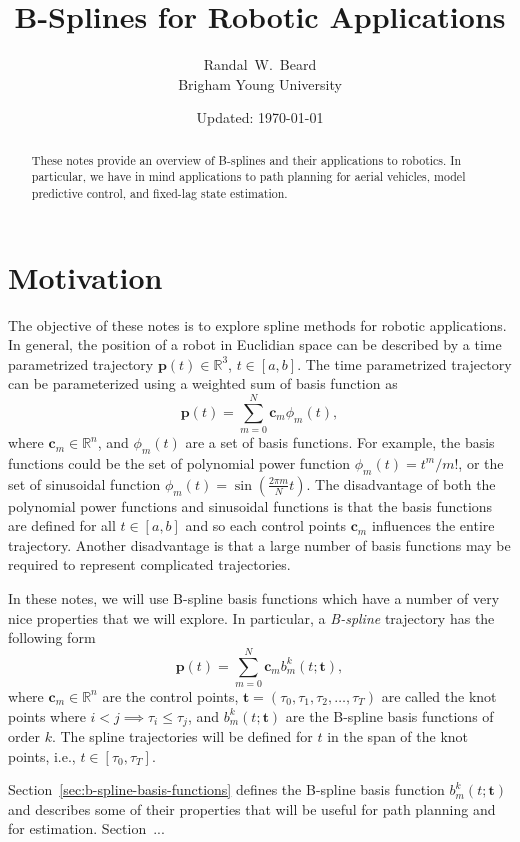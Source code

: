 \documentclass{article}
\title{\LARGE \bf
B-Splines for Robotic Applications
}
\date{Updated: \today}
\author{Randal~W.~Beard \\ Brigham Young University}
\newcommand{\cbf}{\mathbf{c}}
\begin{document}
\maketitle

\begin{abstract}
These notes provide an overview of B-splines and their applications to robotics.  In particular, we have in mind applications to path planning for aerial vehicles, model predictive control, and fixed-lag state estimation.  
\end{abstract}

\section{Motivation}

The objective of these notes is to explore spline methods for robotic applications. In general, the position of a robot in Euclidian space can be described by a time parametrized trajectory $\mathbf{p}(t)\in\mathbb{R}^3$, $t\in[a,b]$.  The time parametrized trajectory can be parameterized using a weighted sum of basis function as
\[
\mathbf{p}(t) = \sum_{m=0}^{N} \cbf_m \phi_m(t),
\]
where $\cbf_m\in\mathbb{R}^n$, and $\phi_m(t)$ are a set of basis functions.  For example, the basis functions could be the set of polynomial power function $\phi_m(t) = t^m/m!$, or the set of sinusoidal function $\phi_m(t) = \sin(\frac{2\pi m}{N}t)$.  The disadvantage of both the polynomial power functions and sinusoidal functions is that the basis functions are defined for all $t\in[a,b]$ and so each control points $\mathbf{c}_m$ influences the entire trajectory.  Another disadvantage is that a large number of basis functions may be required to represent complicated trajectories.  

In these notes, we will use B-spline basis functions which have a number of very nice properties that we will explore.  In particular, a {\em B-spline} trajectory has the following form
\[
\mathbf{p}(t) = \sum_{m=0}^{N} \cbf_m b_m^k(t;\mathbf{t}),
\]
where $\cbf_m\in\mathbb{R}^n$ are the control points,  $\mathbf{t}=(\tau_0, \tau_1, \tau_2, \dots, \tau_T)$ are called the knot points where $i<j \implies \tau_i\leq \tau_j$, and $b_m^k(t;\mathbf{t})$ are the B-spline basis functions of order $k$. The spline trajectories will be defined for $t$ in the span of the knot points, i.e., $t\in[\tau_0, \tau_T]$.  

Section~\ref{sec:b-spline-basis-functions} defines the B-spline basis function $b_m^k(t; \mathbf{t})$ and describes some of their properties that will be useful for path planning and for estimation.
Section~...
\end{document}
